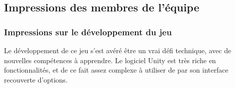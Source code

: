 \subsection{Impressions des membres de l'équipe}

    \subsubsection{Impressions sur le développement du jeu}

        Le développement de ce jeu s'est avéré être un vrai défi technique, avec de nouvelles compétences à apprendre. 
        Le logiciel Unity est très riche en fonctionnalités, et de ce fait assez complexe à utiliser de par son interface 
        recouverte d'options.